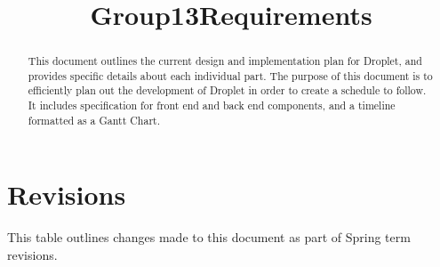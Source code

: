 \documentclass[draftclsnofoot, onecolumn, letterpaper,10pt,compsoc]{IEEEtran}
\title{Group13Requirements}
\def \TitlePageHeader{Droplet Productions}
\def \TitlePageTitle{Design}
\def \GroupNumber{by Group 13}
\def \GroupMembers{James Barry, Tarren Engberg, Dennis Li, James Luo,  Brice Ng}
\def \ClientSignature {David Vasquez has approved this document}
\def \CourseTitle{CS 463 - Senior Design}
\def \CourseTerm{Spring 2018}
\newcommand{\NameSigPair}[1]{\par
\makebox[2.75in][r]{#1} \hfil 	\makebox[3.25in]{\makebox[2.25in]{\hrulefill} \hfill		\makebox[.75in]{\hrulefill}}
\par\vspace{-12pt} \textit{\tiny\noindent
\makebox[2.75in]{} \hfil		\makebox[3.25in]{\makebox[2.25in][r]{Signature} \hfill	\makebox[.75in][r]{Date}}}}
\renewcommand{\NameSigPair}[1]{#1}
\begin{document}
\begin{titlepage}
    \begin{singlespace}
        \hfill    
        \par\vspace{.2in}
        \centering
        \scshape{
            \huge \TitlePageHeader \par
            {\large\today}\par
            \vspace{.5in}
            \textbf{\Huge \TitlePageTitle }\par
            \vfill
            \vspace{5pt}

            \vspace{5pt}
            {\Large
                \NameSigPair{\GroupNumber}\par
            	\NameSigPair{\GroupMembers}\par
            	\NameSigPair{\textbf{\ClientSignature\par}}
                \NameSigPair{\CourseTitle}\par
                \NameSigPair{\CourseTerm}\par
            }
            \vspace{20pt}
        }
    \end{singlespace}
    \begin{abstract}
    This document outlines the current design and implementation plan for Droplet, and provides specific details about each individual part. The purpose of this document is to efficiently plan out the development of Droplet in order to create a schedule to follow. It includes specification for front end and back end components, and a timeline formatted as a Gantt Chart.
    \end{abstract}
\end{titlepage}

\newpage
{}
\clearpage

\pagebreak

\tableofcontents

\pagebreak

\section{Revisions}

This table outlines changes made to this document as part of Spring term revisions. \\
\end{document}
